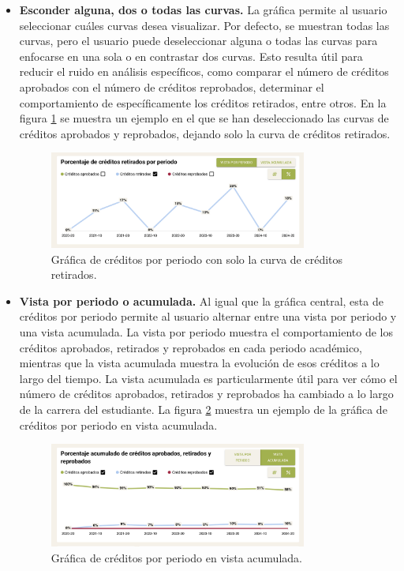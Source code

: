 \begin{itemize}
	\item \textbf{Esconder alguna, dos o todas las curvas.} La gráfica permite al usuario seleccionar cuáles curvas desea visualizar. Por defecto, se muestran todas las curvas, pero el usuario puede deseleccionar alguna o todas las curvas para enfocarse en una sola o en contrastar dos curvas. Esto resulta útil para reducir el ruido en análisis específicos, como comparar el número de créditos aprobados con el número de créditos reprobados, determinar el comportamiento de específicamente los créditos retirados, entre otros. En la figura \ref{fig:creditos_retirados} se muestra un ejemplo en el que se han deseleccionado las curvas de créditos aprobados y reprobados, dejando solo la curva de créditos retirados.

	      \begin{figure}[H]
		      \centering
		      \includegraphics[width=0.8\textwidth]{assets/nes/creditos_retirados.png}
		      \caption{Gráfica de créditos por periodo con solo la curva de créditos retirados.}
		      \label{fig:creditos_retirados}
	      \end{figure}

	\item \textbf{Vista por periodo o acumulada.} Al igual que la gráfica central, esta de créditos por periodo permite al usuario alternar entre una vista por periodo y una vista acumulada. La vista por periodo muestra el comportamiento de los créditos aprobados, retirados y reprobados en cada periodo académico, mientras que la vista acumulada muestra la evolución de esos créditos a lo largo del tiempo. La vista acumulada es particularmente útil para ver cómo el número de créditos aprobados, retirados y reprobados ha cambiado a lo largo de la carrera del estudiante. La figura \ref{fig:creditos_acumulados} muestra un ejemplo de la gráfica de créditos por periodo en vista acumulada.

	      \begin{figure}[H]
		      \centering
		      \includegraphics[width=0.8\textwidth]{assets/nes/creditos_acumulados.png}
		      \caption{Gráfica de créditos por periodo en vista acumulada.}
		      \label{fig:creditos_acumulados}
	      \end{figure}


\end{itemize}
